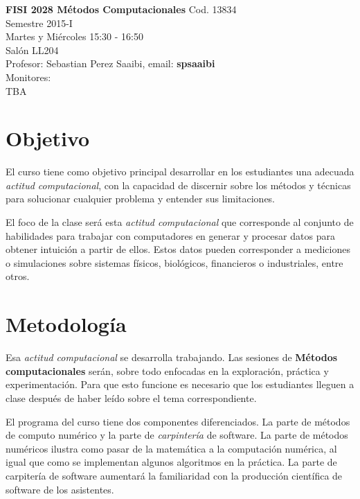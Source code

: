 \documentclass[11pt]{article}
\begin{document}
\noindent
\textbf{FISI 2028 M\'etodos Computacionales}
Cod. 13834\\
Semestre 2015-I\\
Martes y Mi\'ercoles 15:30 - 16:50 \\
Sal\'on LL204\\
Profesor: Sebastian Perez Saaibi, email: \textbf{spsaaibi}\\
Monitores: \\
TBA \\


\section*{Objetivo}
El curso tiene como objetivo principal desarrollar en los
estudiantes una adecuada \emph{actitud computacional}, con la capacidad de
discernir sobre los m\'etodos y t\'ecnicas para solucionar cualquier 
problema y entender sus limitaciones.
 
El foco de la clase ser\'a esta \emph{actitud computacional} que
corresponde al conjunto de habilidades para trabajar con computadores
en generar y procesar datos para obtener intuici\'on a partir de ellos. Estos datos pueden
corresponder a mediciones o simulaciones sobre sistemas f\'isicos, biol\'ogicos, financieros o industriales, entre otros.

\section*{Metodolog\'ia}
Esa \emph{actitud computacional} se desarrolla trabajando. Las
sesiones de \textbf{M\'etodos computacionales} ser\'an, sobre todo 
enfocadas en la exploraci\'on, pr\'actica y experimentaci\'on. Para que esto
funcione es necesario que los estudiantes lleguen a clase despu\'es de
haber le\'ido sobre el tema correspondiente. 

El programa del curso tiene dos componentes diferenciados. La parte de
m\'etodos de computo num\'erico y la parte de
\emph{carpinter\'ia} de software. La parte de m\'etodos num\'ericos
ilustra como pasar de la matem\'atica a la computaci\'on num\'erica,
al igual que como se implementan algunos algoritmos en la pr\'actica. 
La parte de carpiter\'ia de software aumentar\'a la familiaridad con
la producci\'on cient\'ifica de software de los asistentes.
\end{document}
